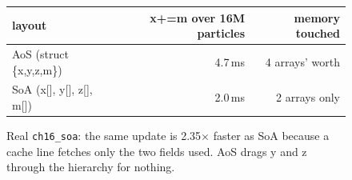 \begin{figure}[htbp]
\centering
\begin{tabular}{lrr}
\toprule
layout & x+=m over 16M particles & memory touched \\
\midrule
AoS (struct\,\{x,y,z,m\}) & 4.7\,ms & 4 arrays' worth \\
SoA (x[], y[], z[], m[]) & 2.0\,ms & 2 arrays only \\
\bottomrule
\end{tabular}
\caption{Real \texttt{ch16\_soa}: the same update is 2.35$\times$
faster as SoA because a cache line fetches only the two fields used.
AoS drags y and z through the hierarchy for nothing.}
\label{fig:soa16}
\end{figure}
